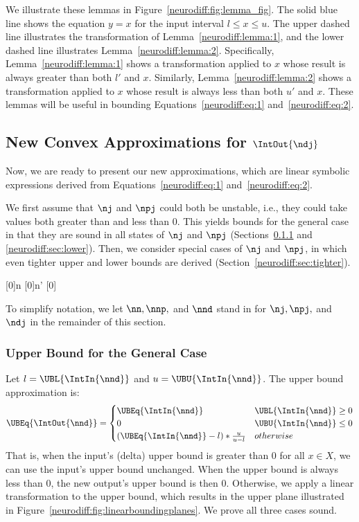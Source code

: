 We illustrate these lemmas in Figure~\ref{neurodiff:fig:lemma_fig}. The solid
blue line shows the equation $ y = x $ for the input interval $ l \leq
x \leq u $. The upper dashed line illustrates the transformation of
Lemma~\ref{neurodiff:lemma:1}, and the lower dashed line illustrates
Lemma~\ref{neurodiff:lemma:2}. Specifically, Lemma~\ref{neurodiff:lemma:1} shows a
transformation applied to $ x $ whose result is always greater than
both $ l' $ and $ x $. Similarly, Lemma~\ref{neurodiff:lemma:2} shows a
transformation applied to $ x $ whose result is always less than both
$ u' $ and $ x $. These lemmas will be useful in bounding
Equations~\ref{neurodiff:eq:1}
and~\ref{neurodiff:eq:2}.

\subsection{New Convex Approximations for $ \IntOut{\ndj} $}
\label{neurodiff:sec:convex}

Now, we are ready to present our new approximations, which are
linear symbolic expressions derived from Equations~\ref{neurodiff:eq:1}
and~\ref{neurodiff:eq:2}.


We first assume that $ \nj $ and $ \npj $ could both be unstable,
i.e., they could take values both greater than and less than 0. This
yields bounds for the general case in that they are sound in all
states of $ \nj $ and $ \npj $ (Sections~\ref{neurodiff:sec:upper}
and \ref{neurodiff:sec:lower}).
%
Then, we consider special cases of $ \nj $ and $ \npj $, in
which even tighter upper and lower bounds are derived
(Section~\ref{neurodiff:sec:tighter}).

\declarecommand{\nn}[0]{n}
\declarecommand{\nnp}[0]{n'}
\declarecommand{\nnd}[0]{\Delta}

To simplify notation, we let $ \nn, \nnp,$ and $ \nnd $ stand in for $ \nj,
\npj, $ and $ \ndj $ in the remainder of this section.

\subsubsection{Upper Bound for the General Case}
\label{neurodiff:sec:upper}

Let $ l = \UBL{\IntIn{\nnd}}$ and $ u = \UBU{\IntIn{\nnd}} $. The
upper bound approximation is:
%
\[
\UBEq{\IntOut{\nnd}} = \begin{cases}
\UBEq{\IntIn{\nnd}} & \UBL{\IntIn{\nnd}} \geq 0\\
0 & \UBU{\IntIn{\nnd}} \leq 0 \\
(\UBEq{\IntIn{\nnd}} - l)*\frac{u}{u - l} & otherwise
\end{cases}
\]
%
That is, when the input's (delta) upper bound is greater than 0 for all $
x \in X $, we can use the input's upper bound unchanged.  When the
upper bound is always less than 0, the new output's upper
bound is then 0. Otherwise, we apply a linear transformation to the
upper bound, which results in the upper plane illustrated in
Figure~\ref{neurodiff:fig:linearboundingplanes}. We prove all three cases sound.

